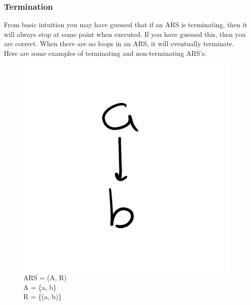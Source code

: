 \documentclass{article}
\begin{document}
{\subsubsection{Termination}

\medskip\noindent
From basic intuition you may have guessed that if an ARS is terminating, then it will always stop at some point when executed. If you have guessed this, then you are correct. When there are no loops in an ARS, it will eventually terminate. Here are some examples of terminating and non-terminating ARS’s.

\begin{figure}[h!]
  \centering
  \includegraphics[scale=0.06]{gen3}
  \caption[] {
     ARS = (A, R) \\ A = \{a, b\} \\ R = \{(a, b)\}
    \endtabular}
\end{figure}

}
\end{document}
